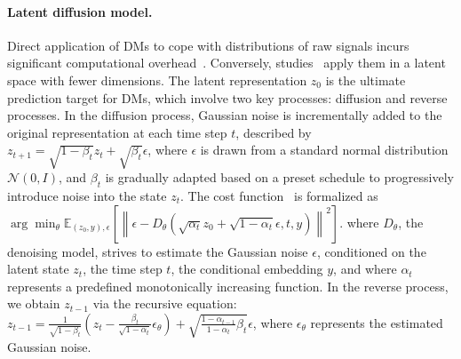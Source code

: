 \paragraph{Latent diffusion model.}
Direct application of DMs to cope with distributions of raw signals incurs significant computational overhead~\citep{ho2020denoising, song2020denoising}. Conversely, studies~\citep{liu2023audioldm, liu2023audioldm2} apply them in a latent space with fewer dimensions. %
The latent representation \( z_0 \) is the ultimate prediction target for DMs, which involve two key processes: diffusion and reverse processes. In the diffusion process, Gaussian noise is incrementally added to the original representation at each time step \( t \), described by \( z_{t+1} = \sqrt{1-\beta_t} z_t + \sqrt{\beta_t} \epsilon \), where \( \epsilon \) is drawn from a standard normal distribution \( \mathcal{N}(0, I) \), and \( \beta_t \) is gradually adapted based on a preset schedule to progressively introduce noise into the state \( z_t \).
The cost function~\citep{ho2020denoising,liu2023audioldm} is formalized as
\(
\arg\min_{\theta}  \mathbb{E}_{{(z_0, y), \epsilon}} \left[ \left\| \epsilon - D_\theta\left(\sqrt{\alpha_t}z_0 + \sqrt{1-\alpha_t}\epsilon, t, y\right) \right\|^2 \right] 
\).
where \( D_\theta \), the denoising model, strives to estimate the Gaussian noise \( \epsilon \), conditioned on the latent state \( z_t \), the time step \( t \), the conditional embedding \( y \), and where \(\alpha_t\) represents a predefined monotonically increasing function.
{In the reverse process, we obtain \( z_{t-1} \) via the recursive equation:
\(
z_{t-1} = \frac{1}{\sqrt{1- \beta_t}}\left( z_{t} - \frac{\beta_t}{\sqrt{1-\alpha_t}}\epsilon_\theta \right)  + \sqrt{\frac{1-\alpha_{t-1}}{1-\alpha_t}\beta_t}  \epsilon\),
 where \(\epsilon_\theta\) represents the estimated Gaussian noise.}

